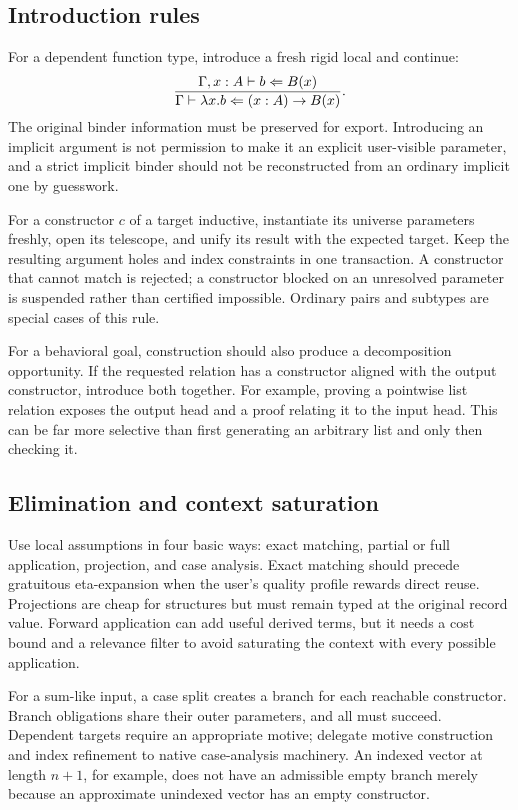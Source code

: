 \subsection{Introduction rules}

For a dependent function type, introduce a fresh rigid local and continue:
\[
 \frac{\Gamma,x:A\vdash b\Leftarrow B(x)}
      {\Gamma\vdash\lambda x.b\Leftarrow (x:A)\to B(x)}.
\]
The original binder information must be preserved for export. Introducing an implicit argument is not permission to make it an explicit user-visible parameter, and a strict implicit binder should not be reconstructed from an ordinary implicit one by guesswork.

For a constructor $c$ of a target inductive, instantiate its universe parameters freshly, open its telescope, and unify its result with the expected target. Keep the resulting argument holes and index constraints in one transaction. A constructor that cannot match is rejected; a constructor blocked on an unresolved parameter is suspended rather than certified impossible. Ordinary pairs and subtypes are special cases of this rule.

For a behavioral goal, construction should also produce a decomposition opportunity. If the requested relation has a constructor aligned with the output constructor, introduce both together. For example, proving a pointwise list relation exposes the output head and a proof relating it to the input head. This can be far more selective than first generating an arbitrary list and only then checking it.

\subsection{Elimination and context saturation}

Use local assumptions in four basic ways: exact matching, partial or full application, projection, and case analysis. Exact matching should precede gratuitous eta-expansion when the user's quality profile rewards direct reuse. Projections are cheap for structures but must remain typed at the original record value. Forward application can add useful derived terms, but it needs a cost bound and a relevance filter to avoid saturating the context with every possible application.

For a sum-like input, a case split creates a branch for each reachable constructor. Branch obligations share their outer parameters, and all must succeed. Dependent targets require an appropriate motive; delegate motive construction and index refinement to native case-analysis machinery. An indexed vector at length $n+1$, for example, does not have an admissible empty branch merely because an approximate unindexed vector has an empty constructor.

